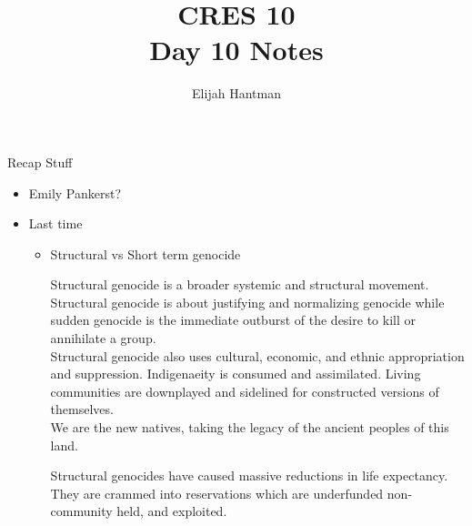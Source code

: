 \documentclass{report}
\title{\Huge{CRES 10}\\Day 10 Notes}
\author{\huge{Elijah Hantman}}
\date{}
\begin{document}
\maketitle
\newpage

\begin{description}
    \item {\large Recap Stuff}
        \begin{itemize}
            \item Emily Pankerst?
            \item Last time
                \begin{itemize}
                    \item Structural vs Short term genocide
                        \begin{mdframed}
                            Structural genocide is a broader
                            systemic and structural movement.
                            Structural genocide is about
                            justifying and normalizing genocide
                            while sudden genocide is the
                            immediate outburst of the desire
                            to kill or annihilate a group.
                            \\
                            Structural genocide also uses
                            cultural, economic, and ethnic
                            appropriation and suppression.
                            Indigenaeity is consumed and
                            assimilated. Living communities
                            are downplayed and sidelined for
                            constructed versions of themselves.
                            \\
                            We are the new natives, taking the
                            legacy of the ancient peoples of
                            this land.
                        \end{mdframed}

                        \begin{mdframed}
                            Structural genocides have caused
                            massive reductions in life
                            expectancy. They are crammed into
                            reservations which are underfunded
                            non-community held, and exploited.


\end{mdframed}
\end{itemize}
\end{itemize}
\end{description}
\end{document}
